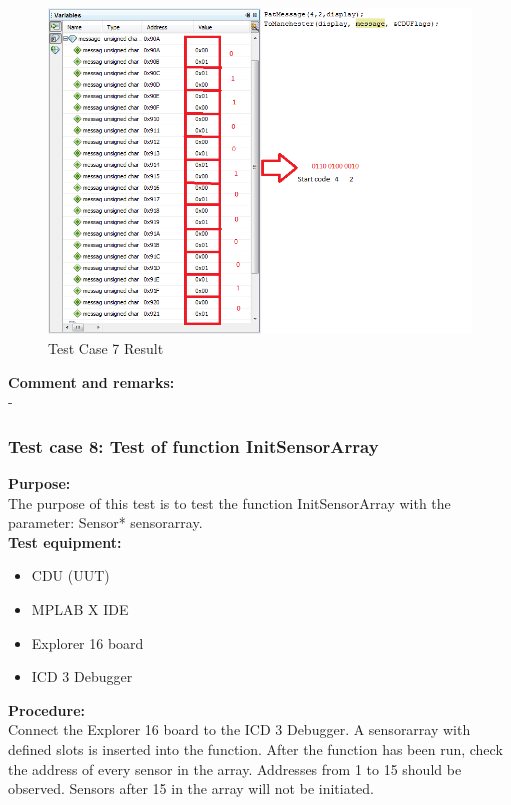 \begin{figure}[H]
\centering
\includegraphics[width=1\textwidth]{billeder/CDUtestcase7}
\caption{Test Case 7 Result}
\label{fig:cdutestcase7}
\end{figure}

\textbf{Comment and remarks:}\\
-\\

\subsubsection{Test case 8: Test of function InitSensorArray }
\textbf{Purpose:}\\
The purpose of this test is to test the function InitSensorArray with the parameter: Sensor* sensorarray.\\

\textbf{Test equipment:}
\begin{itemize}
\item CDU (UUT)
\item MPLAB X IDE
\item Explorer 16 board
\item ICD 3 Debugger
\end{itemize}

\textbf{Procedure:}\\
Connect the Explorer 16 board to the ICD 3 Debugger. A sensorarray with defined slots is inserted into the function. After the function has been run, check the address of every sensor in the array. Addresses from 1 to 15 should be observed. Sensors after 15 in the array will not be initiated.\\

